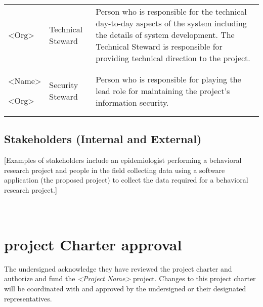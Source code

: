 \begin{longtable}[]{@{}lll@{}}
\begin{minipage}[t]{0.30\columnwidth}
\textless{}Org\textgreater{}\strut
\end{minipage} & \begin{minipage}[t]{0.30\columnwidth}\raggedright
Technical Steward\strut
\end{minipage} & \begin{minipage}[t]{0.30\columnwidth}\raggedright
Person who is responsible for the technical day-to-day aspects of the
system including the details of system development. The Technical
Steward is responsible for providing technical direction to the
project.\strut
\end{minipage}\tabularnewline
\begin{minipage}[t]{0.30\columnwidth}\raggedright
\textless{}Name\textgreater{}

\textless{}Org\textgreater{}\strut
\end{minipage} & \begin{minipage}[t]{0.30\columnwidth}\raggedright
Security Steward\strut
\end{minipage} & \begin{minipage}[t]{0.30\columnwidth}\raggedright
Person who is responsible for playing the lead role for maintaining the
project's information security.\strut
\end{minipage}\tabularnewline
\bottomrule
\end{longtable}

\hypertarget{stakeholders-internal-and-external}{%
\subsection{Stakeholders (Internal and
External)}\label{stakeholders-internal-and-external}}

{[}Examples of stakeholders include an epidemiologist performing a
behavioral research project and people in the field collecting data
using a software application (the proposed project) to collect the data
required for a behavioral research project.{]}

\hypertarget{project-charter-approval}{%
\section{\texorpdfstring{\\
project Charter
approval}{ project Charter approval}}\label{project-charter-approval}}

The undersigned acknowledge they have reviewed the project charter and
authorize and fund the \emph{\textless{}Project Name\textgreater{}}
project. Changes to this project charter will be coordinated with and
approved by the undersigned or their designated representatives.

